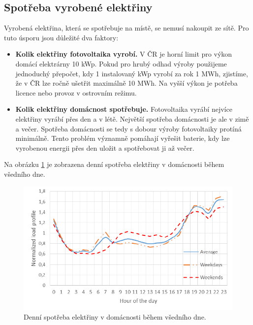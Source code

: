 \subsection{Spotřeba vyrobené elektřiny}

Vyrobená elektřina, která se spotřebuje na místě, se nemusí nakoupit ze sítě.
Pro tuto úsporu jsou důležité dva faktory:

\begin{itemize}
    \item \textbf{Kolik elektřiny fotovoltaika vyrobí.} V ČR je horní limit pro výkon domácí elektrárny 10 \si{\kW}p. Pokud pro hrubý odhad výroby použijeme jednoduchý přepočet, kdy 1 instalovaný \si{\kW}p vyrobí za rok 1 MWh, zjistíme, že v ČR lze ročně ušetřit maximálně 10 MWh. Na vyšší výkon je potřeba licence nebo provoz v ostrovním režimu.
    \item \textbf{Kolik elektřiny domácnost spotřebuje.} Fotovoltaika vyrábí nejvíce elektřiny vyrábí přes den a v létě. Největší spotřeba domácnosti je ale v zimě a večer. Spotřeba domácnosti se tedy s dobour výroby fotovoltaiky protíná minimálně. Tento problém významně pomáhají vyřešit baterie, kdy lze vyrobenou energii přes den uložit a spotřebovat ji až večer.
\end{itemize}

Na obrázku \ref{fig:average_daily_consumption} je zobrazena denní spotřeba elektřiny v domácnosti během všedního dne.

\begin{figure}[H]
    \includegraphics[width=\textwidth]{static/energy_consumption.png}
    \caption{Denní spotřeba elektřiny v domácnosti během všedního dne.} %
    \label{fig:average_daily_consumption}
\end{figure}

